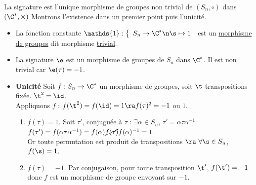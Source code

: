 \documentclass[11pt]{article}
\begin{document}
\begin{corr}{}{}
    La signature est l'unique morphisme de groupes non trivial de $(S_{n}, \circ)$ dans $(\C^{*}, \times)$
    \tcblower
    Montrons l'existence dans un premier point puis l'unicité.
    \begin{itemize}[topsep=0pt,itemsep=-0.9 ex]
        \item La fonction constante
        $\mathds{1} : \left\{ \begin{array}{ll}
             S_{n} \to \C^{*}  \n
             \s \mapsto 1
        \end{array}\right.$ est un \underline{morphisme de groupes} dit morphisme \underline{trivial}.
        \item La signature $\e$ est un morphisme de groupes de $S_{n}$ dans $\C^{*}$. Il est non trivial car $\e(\tau) = -1$.
        \item \textbf{Unicité} Soit $f : S_{n} \to \C^{*}$ un morphisme de groupes, soit $\t$ transpositions fixée. $\t^2 = \id$.\\
        Appliquons $f$ : $f(\t^2) = f(\id) = 1 \ra f(\tau)^{2} = -1$ ou $1$.
        \begin{enumerate}[topsep=0pt,itemsep=-0.7 ex]
            \item $f(\tau) = 1$. Soit $\tau'$, conjuguée à $\tau$ : $\exists \alpha \in S_{n}$, $\tau' = \alpha \tau \alpha^{-1}$
            $f(\tau') = f(\alpha \tau \alpha^{-1}) = f(\alpha) \cancel{f(\tau)} f(\alpha)^{-1} = 1$.\\
            Or toute permutation est produit de transpositions $\ra ~ \forall \s \in S_{n}$, $f(\s) = 1$.
            \item $f(\tau) = -1$. Par conjugaison, pour toute transposition $\t'$, $f(\t') = -1$ donc $f$ est un morphisme de groupe envoyant sur $-1$.
        \end{enumerate}
    \end{itemize}
\end{corr}
\end{document}
